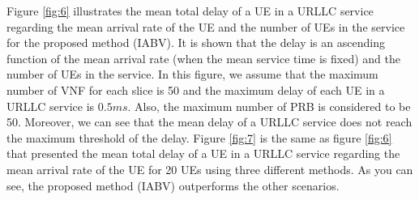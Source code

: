 \documentclass[lettersize,journal]{IEEEtran}
\begin{document}
Figure \ref{fig:6} illustrates the mean total delay of a UE in a URLLC service regarding the mean arrival rate of the UE and the number of UEs in the service for the proposed method (IABV).
It is shown that the delay is an ascending function of the mean arrival rate (when the mean service time is fixed) and the number of UEs in the service. In this figure, we assume that the maximum number of VNF for each slice is 50 and the maximum delay of each UE in a URLLC service is $0.5ms$. Also, the maximum number of PRB is considered to be 50. 
 Moreover, we can see that the mean delay of a URLLC service 
does not reach the maximum threshold of the delay.
Figure \ref{fig:7} is the same as figure \ref{fig:6} that presented the mean total delay of a UE in a URLLC service regarding the mean arrival rate of the UE for 20 UEs using three different methods. As you can see, the proposed method (IABV) outperforms the other scenarios.
\end{document}
